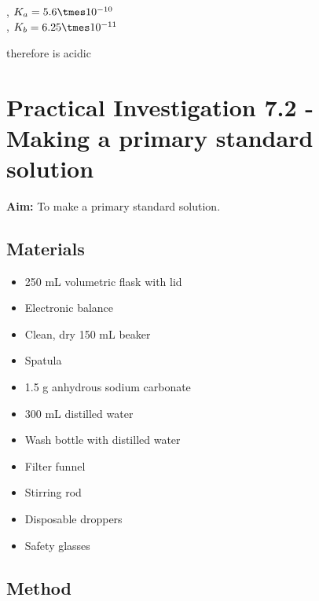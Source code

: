 		\begin{center}
			 \\
			 , $K_a = 5.6 \tmes 10^{-10}$  \\
			 , $K_b = 6.25 \tmes 10^{-11}$  
		\end{center}

		therefore is acidic

\section{Practical Investigation 7.2 - Making a primary standard solution} \label{06/03/2025}

	\textbf{Aim:} To make a primary standard solution.

	\subsection{Materials}
	
		\begin{itemize}
			\item 250 mL volumetric flask with lid
			\item Electronic balance
			\item Clean, dry 150 mL beaker
			\item Spatula
			\item 1.5 g anhydrous sodium carbonate
			\item 300 mL distilled water
			\item Wash bottle with distilled water
			\item Filter funnel
			\item Stirring rod
			\item Disposable droppers
			\item Safety glasses
		\end{itemize}

	\subsection{Method}

